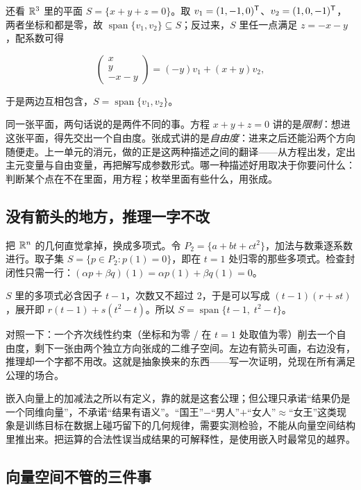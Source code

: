 还看 \(\mathbb{R}^3\) 里的平面 \(S=\{x+y+z=0\}\)。取 \(v_1=(1,-1,0)^{\mathsf{T}}\)、\(v_2=(1,0,-1)^{\mathsf{T}}\)，两者坐标和都是零，故 \(\operatorname{span}\{v_1,v_2\}\subseteq S\)；反过来，\(S\) 里任一点满足 \(z=-x-y\)，配系数可得

\[
\begin{pmatrix}x\\y\\-x-y\end{pmatrix}
=(-y)v_1+(x+y)v_2 ,
\]

于是两边互相包含，\(S=\operatorname{span}\{v_1,v_2\}\)。

同一张平面，两句话说的是两件不同的事。方程 \(x+y+z=0\) 讲的是\emph{限制}：想进这张平面，得先交出一个自由度。张成式讲的是\emph{自由度}：进来之后还能沿两个方向随便走。上一单元的消元，做的正是这两种描述之间的翻译——从方程出发，定出主元变量与自由变量，再把解写成参数形式。哪一种描述好用取决于你要问什么：判断某个点在不在里面，用方程；枚举里面有些什么，用张成。

\subsection{没有箭头的地方，推理一字不改}

把 \(\mathbb{R}^n\) 的几何直觉拿掉，换成多项式。令 \(P_2=\{a+bt+ct^2\}\)，加法与数乘逐系数进行。取子集 \(S=\{p\in P_2:p(1)=0\}\)，即在 \(t=1\) 处归零的那些多项式。检查封闭性只需一行：\((\alpha p+\beta q)(1)=\alpha p(1)+\beta q(1)=0\)。

\(S\) 里的多项式必含因子 \(t-1\)，次数又不超过 2，于是可以写成 \((t-1)(r+st)\)，展开即 \(r(t-1)+s(t^2-t)\)。所以 \(S=\operatorname{span}\{t-1,\;t^2-t\}\)。

对照一下：一个齐次线性约束（坐标和为零 / 在 \(t=1\) 处取值为零）削去一个自由度，剩下一张由两个独立方向张成的二维子空间。左边有箭头可画，右边没有，推理却一个字都不用改。这就是抽象换来的东西——写一次证明，兑现在所有满足公理的场合。

\begin{remark}
嵌入向量上的加减法之所以有定义，靠的就是这套公理；但公理只承诺``结果仍是一个同维向量''，不承诺``结果有语义''。``国王''\(-\)``男人''\(+\)``女人''\(\approx\)``女王''这类现象是训练目标在数据上碰巧留下的几何规律，需要实测检验，不能从向量空间结构里推出来。把运算的合法性误当成结果的可解释性，是使用嵌入时最常见的越界。
\end{remark}

\subsection{向量空间不管的三件事}

